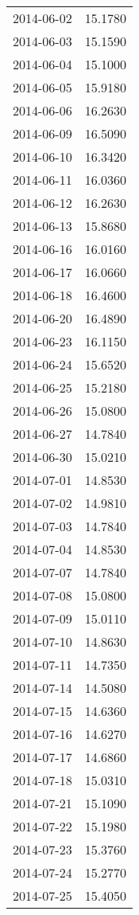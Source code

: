 \begin{tabular}{lr}
2014-06-02 &     15.1780 \\
2014-06-03 &     15.1590 \\
2014-06-04 &     15.1000 \\
2014-06-05 &     15.9180 \\
2014-06-06 &     16.2630 \\
2014-06-09 &     16.5090 \\
2014-06-10 &     16.3420 \\
2014-06-11 &     16.0360 \\
2014-06-12 &     16.2630 \\
2014-06-13 &     15.8680 \\
2014-06-16 &     16.0160 \\
2014-06-17 &     16.0660 \\
2014-06-18 &     16.4600 \\
2014-06-20 &     16.4890 \\
2014-06-23 &     16.1150 \\
2014-06-24 &     15.6520 \\
2014-06-25 &     15.2180 \\
2014-06-26 &     15.0800 \\
2014-06-27 &     14.7840 \\
2014-06-30 &     15.0210 \\
2014-07-01 &     14.8530 \\
2014-07-02 &     14.9810 \\
2014-07-03 &     14.7840 \\
2014-07-04 &     14.8530 \\
2014-07-07 &     14.7840 \\
2014-07-08 &     15.0800 \\
2014-07-09 &     15.0110 \\
2014-07-10 &     14.8630 \\
2014-07-11 &     14.7350 \\
2014-07-14 &     14.5080 \\
2014-07-15 &     14.6360 \\
2014-07-16 &     14.6270 \\
2014-07-17 &     14.6860 \\
2014-07-18 &     15.0310 \\
2014-07-21 &     15.1090 \\
2014-07-22 &     15.1980 \\
2014-07-23 &     15.3760 \\
2014-07-24 &     15.2770 \\
2014-07-25 &     15.4050 \\

\end{tabular}
